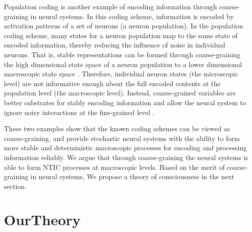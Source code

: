 \documentclass[utf8]{article}
\begin{document}
		Population coding is another example of encoding information through coarse-graining in neural systems. In this coding scheme, information is encoded by activation patterns of a set of neurons (a neuron population). In the population coding scheme, many states for a neuron population map to the same state of encoded information, thereby reducing the influence of noise in individual neurons. That is, stable representations can be formed through coarse-graining the high dimensional state space of a neuron population to a lower dimensional macroscopic state space \citep{kristan1997population, pouget2000information, binder2009encyclopedia, QuianQuiroga2009}. Therefore, individual neuron states (the microscopic level) are not informative enough about the full encoded contents at the population level (the macroscopic level). Instead, coarse-grained variables are better substrates for stably encoding information and allow the neural system to ignore noisy interactions at the fine-grained level \citep{Woodward2007-WOOCWA}.
		
        These two examples show that the known coding schemes can be viewed as coarse-graining, and provide stochastic neural systems with the ability to form more stable and deterministic macroscopic processes for encoding and processing information reliably. We argue that through coarse-graining the neural systems is able to form NTIC processes at macroscopic levels. Based on the merit of coarse-graining in neural systems, We propose a theory of consciousness in the next section. 


			
			




	\section{\acf{OurTheory}}\label{sec:OurTheory}
	
\end{document}
